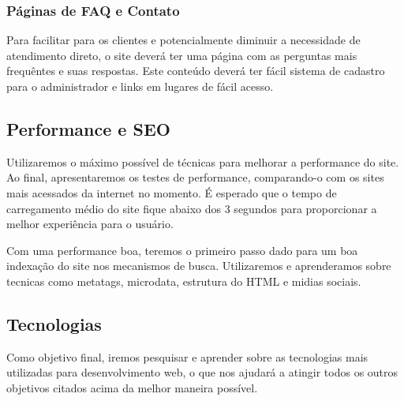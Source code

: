 \subsubsection{Páginas de FAQ e Contato}
Para facilitar para os clientes e potencialmente diminuir a necessidade de atendimento direto, o site deverá ter uma página com as perguntas mais frequêntes e suas respostas. Este conteúdo deverá ter fácil sistema de cadastro para o administrador e links em lugares de fácil acesso.

\subsection{Performance e SEO}

Utilizaremos o máximo possível de técnicas para melhorar a performance do site. Ao final, apresentaremos os testes de performance, comparando-o com os sites mais acessados da internet no momento. É esperado que o tempo de carregamento médio do site fique abaixo dos 3 segundos para proporcionar a melhor experiência para o usuário.

Com uma performance boa, teremos o primeiro passo dado para um boa indexação do site nos mecanismos de busca. Utilizaremos e aprenderamos sobre tecnicas como metatags, microdata, estrutura do HTML e midias sociais.

\subsection{Tecnologias}

Como objetivo final, iremos pesquisar e aprender sobre as tecnologias mais utilizadas para desenvolvimento web, o que nos ajudará a atingir todos os outros objetivos citados acima da melhor maneira possível.
